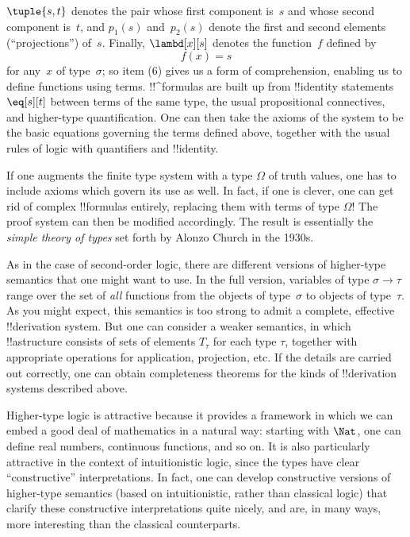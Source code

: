 \documentclass[../../../include/open-logic-section]{subfiles}
\begin{document}
$\tuple{s, t}$ denotes the pair whose first component is~$s$ and whose
second component is~$t$, and $p_1(s)$ and~$p_2(s)$ denote the first
and second elements (``projections'') of~$s$. Finally, $\lambd[x][s]$
denotes the function~$f$ defined by
\[
f(x) = s
\]
for any~$x$ of type~$\sigma$; so item (6) gives us a form of
comprehension, enabling us to define functions using
terms. !!^{formula}s are built up from !!{identity} statements $\eq[s][t]$
between terms of the same type, the usual propositional connectives,
and higher-type quantification. One can then take the axioms of the
system to be the basic equations governing the terms defined above,
together with the usual rules of logic with quantifiers and !!{identity}.

If one augments the finite type system with a type $\Omega$ of truth
values, one has to include axioms which govern its use as well. In
fact, if one is clever, one can get rid of complex !!{formula}s
entirely, replacing them with terms of type $\Omega$!{} The proof
system can then be modified accordingly. The result is essentially the
\emph{simple theory of types} set forth by Alonzo Church in the 1930s.

As in the case of second-order logic, there are different versions of
higher-type semantics that one might want to use. In the full version,
variables of type $\sigma \to \tau$ range over the set of \emph{all}
functions from the objects of type~$\sigma$ to objects of type~$\tau$.
As you might expect, this semantics is too strong to admit a complete,
effective !!{derivation} system. But one can consider a weaker semantics, in
which !!a{structure} consists of sets of elements $T_\tau$ for each
type $\tau$, together with appropriate operations for application,
projection, etc. If the details are carried out correctly, one can
obtain completeness theorems for the kinds of !!{derivation} systems described
above.

Higher-type logic is attractive because it provides a framework in
which we can embed a good deal of mathematics in a natural way:
starting with $\Nat$, one can define real numbers, continuous
functions, and so on. It is also particularly attractive in the
context of intuitionistic logic, since the types have clear
``constructive'' interpretations. In fact, one can develop constructive
versions of higher-type semantics (based on intuitionistic, rather
than classical logic) that clarify these constructive interpretations
quite nicely, and are, in many ways, more interesting than the
classical counterparts.
\end{document}
